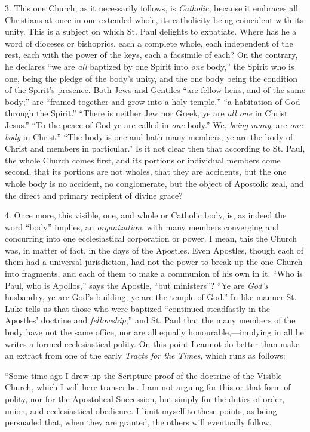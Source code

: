 3. This one Church, as it necessarily follows, is \emph{Catholic},
because it embraces all Christians at once in one extended whole, its
catholicity being coincident with its unity. This is a subject on
which St. Paul delights to expatiate. Where has he a word of dioceses
or bishoprics, each a complete whole, each independent of the rest,
each with the power of the keys, each a facsimile of each? On the
contrary, he declares ``we are \emph{all} baptized by one Spirit into
\emph{one}
body,'' the Spirit who is one, being the pledge of the body's
unity, and the one body being the condition of the Spirit's presence.
Both Jews and Gentiles ``are fellow-heirs, and of the same
body;'' are ``framed together and grow into a holy
temple,'' ``a habitation of God through the Spirit.''
``There is neither Jew nor Greek, ye are \emph{all one} in Christ
Jesus.'' ``To the peace of God ye are called in \emph{one}
body.'' We, \emph{being many}, are \emph{one body} in Christ.'' ``The
body is one and hath many members; ye are the body of Christ and
members in particular.'' Is it not clear then that according to
St. Paul, the whole Church comes first, and its portions or individual
members come second, that its portions are not wholes, that they are
accidents, but the one whole body is no accident, no conglomerate, but
the object of Apostolic zeal, and the direct and primary recipient of
divine grace?

4. Once more, this visible, one, and whole or Catholic body, is, as
indeed the word ``body'' implies, an \emph{organization}, with
many members converging and concurring into one ecclesiastical
corporation or power. I mean, this the Church was, in matter of fact,
in the days of the Apostles. Even Apostles, though each of them
had a universal jurisdiction, had not the power to break up the one
Church into fragments, and each of them to make a communion of his own
in it. ``Who is Paul, who is Apollos,'' says the Apostle,
``but ministers''? ``Ye are \emph{God's} husbandry, ye are
God's building, ye are the temple of God.'' In like manner St.
Luke tells us that those who were baptized ``continued steadfastly
in the Apostles' doctrine and \emph{fellowship};'' and St. Paul
that the many members of the body have not the same office, nor are
all equally honourable,—implying in all he writes a formed
ecclesiastical polity. On this point I cannot do better than make an
extract from one of the early \emph{Tracts for the Times}, which runs
as follows:

``Some time ago I drew up the Scripture proof of the doctrine
of the Visible Church, which I will here transcribe. I am not arguing
for this or that form of polity, nor for the Apostolical Succession,
but simply for the duties of order, union, and ecclesiastical
obedience. I limit myself to these points, as being persuaded that,
when they are granted, the others will eventually follow.

